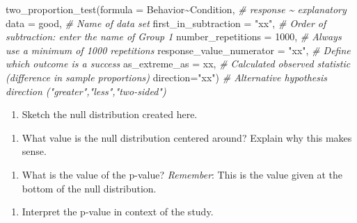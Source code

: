 \documentclass[
]{report}
\newenvironment{Shaded}{\begin{snugshade}}{\end{snugshade}}
\newcommand{\AttributeTok}[1]{\textcolor[rgb]{0.77,0.63,0.00}{#1}}
\newcommand{\CommentTok}[1]{\textcolor[rgb]{0.56,0.35,0.01}{\textit{#1}}}
\newcommand{\DecValTok}[1]{\textcolor[rgb]{0.00,0.00,0.81}{#1}}
\newcommand{\FunctionTok}[1]{\textcolor[rgb]{0.00,0.00,0.00}{#1}}
\newcommand{\NormalTok}[1]{#1}
\newcommand{\SpecialCharTok}[1]{\textcolor[rgb]{0.00,0.00,0.00}{#1}}
\newcommand{\StringTok}[1]{\textcolor[rgb]{0.31,0.60,0.02}{#1}}
\providecommand{\tightlist}{%
  \setlength{\itemsep}{0pt}\setlength{\parskip}{0pt}}
\begin{document}
\begin{Shaded}
\begin{Highlighting}[]
\FunctionTok{two\_proportion\_test}\NormalTok{(}\AttributeTok{formula =}\NormalTok{ Behavior}\SpecialCharTok{\textasciitilde{}}\NormalTok{Condition, }\CommentTok{\# response \textasciitilde{} explanatory}
    \AttributeTok{data =}\NormalTok{ good, }\CommentTok{\# Name of data set}
    \AttributeTok{first\_in\_subtraction =} \StringTok{"xx"}\NormalTok{, }\CommentTok{\# Order of subtraction: enter the name of Group 1}
    \AttributeTok{number\_repetitions =} \DecValTok{1000}\NormalTok{, }\CommentTok{\# Always use a minimum of 1000 repetitions}
    \AttributeTok{response\_value\_numerator =} \StringTok{"xx"}\NormalTok{, }\CommentTok{\# Define which outcome is a success }
    \AttributeTok{as\_extreme\_as =}\NormalTok{ xx, }\CommentTok{\# Calculated observed statistic (difference in sample proportions)}
    \AttributeTok{direction=}\StringTok{"xx"}\NormalTok{) }\CommentTok{\# Alternative hypothesis direction ("greater","less","two{-}sided")}
\end{Highlighting}
\end{Shaded}

\begin{enumerate}
\def\labelenumi{\arabic{enumi}.}
\setcounter{enumi}{16}
\tightlist
\item
  Sketch the null distribution created here.
\end{enumerate}

\vspace{1.5in}

\begin{enumerate}
\def\labelenumi{\arabic{enumi}.}
\setcounter{enumi}{17}
\tightlist
\item
  What value is the null distribution centered around? Explain why this makes sense.
\end{enumerate}

\vspace{.8in}

\begin{enumerate}
\def\labelenumi{\arabic{enumi}.}
\setcounter{enumi}{18}
\tightlist
\item
  What is the value of the p-value? \emph{Remember}: This is the value given at the bottom of the null distribution.
\end{enumerate}

\vspace{0.2in}
\newpage

\begin{enumerate}
\def\labelenumi{\arabic{enumi}.}
\setcounter{enumi}{19}
\tightlist
\item
  Interpret the p-value in context of the study.
\end{enumerate}
\end{document}
